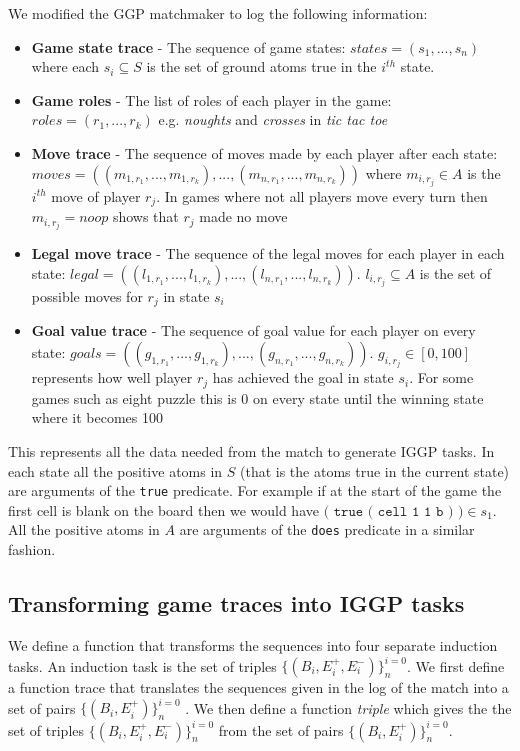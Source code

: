 We modified the GGP matchmaker to log the following information:
\begin{itemize}
	\item \textbf{Game state trace} - The sequence of game states: $states = (s_1,...,s_n)$ where each $s_i \subseteq S$ is the set of ground atoms true in the $i^{th}$ state.
	\item \textbf{Game roles} - The list of roles of each player in the game: $roles = (r_1,...,r_k)$ e.g. \textit{noughts} and \textit{crosses} in \textit{tic tac toe}
	\item \textbf{Move trace} - The sequence of moves made by each player after each state: $moves = ((m_{1,r_1},...,m_{1,r_k}),...,(m_{n,r_1},...,m_{n,r_k}))$ where $m_{i,r_j} \in A$ is the $i^{th}$ move of player $r_j$. In games where not all players move every turn then $m_{i,r_j}=noop$ shows that $r_j$ made no move
	\item \textbf{Legal move trace} - The sequence of the legal moves for each player in each state:  $legal = ((l_{1,r_1},...,l_{1,r_k}),...,(l_{n,r_1},...,l_{n,r_k}))$. $l_{i,r_j} \subseteq A$ is the set of possible moves for $r_j$ in state $s_i$
	\item \textbf{Goal value trace} - The sequence of goal value for each player on every state: $goals = ((g_{1,r_1},...,g_{1,r_k}),...,(g_{n,r_1},...,g_{n,r_k}))$. $g_{i,r_j} \in [0,100]$ represents how well player $r_j$ has achieved the goal in state $s_i$. For some games such as eight puzzle this is 0 on every state until the winning state where it becomes 100

\end{itemize}
This represents all the data needed from the match to generate IGGP tasks. In each state all the positive atoms in $S$ (that is the atoms true in the current state) are arguments of the \texttt{true} predicate. For example if at the start of the game the first cell is blank on the board then we would have $\texttt{( true ( cell 1 1 b ) )} \in s_1$. All the positive atoms in $A$ are arguments of the \texttt{does} predicate in a similar fashion.

\subsection{Transforming game traces into IGGP tasks}

We define a function that transforms the sequences into four separate induction tasks. An induction task is the set of triples $\{(B_i,E_i^+,E_i^-)\}_n^{i=0}$. We first define a function trace that translates the sequences given in the log of the match into a set of pairs $\{(B_i,E_i^+)\}_n^{i=0}$ . We then define a function \textit{triple} which gives the the set of triples  $\{(B_i,E_i^+,E_i^-)\}_n^{i=0}$ from the set of pairs $\{(B_i,E_i^+)\}_n^{i=0}$.
\\

